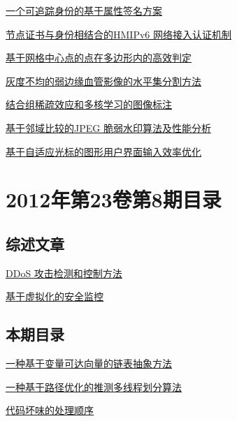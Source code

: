 \documentclass[a4paper]{article}
\begin{document}
\href{http://www.jos.org.cn/ch/reader/download_pdf.aspx?file_no=4172&year_id=2012&quarter_id=9&falg=1}{一个可追踪身份的基于属性签名方案}

\href{http://www.jos.org.cn/ch/reader/download_pdf.aspx?file_no=4188&year_id=2012&quarter_id=9&falg=1}{节点证书与身份相结合的HMIPv6 网络接入认证机制}

\href{http://www.jos.org.cn/ch/reader/download_pdf.aspx?file_no=4087&year_id=2012&quarter_id=9&falg=1}{基于网格中心点的点在多边形内的高效判定}

\href{http://www.jos.org.cn/ch/reader/download_pdf.aspx?file_no=4095&year_id=2012&quarter_id=9&falg=1}{灰度不均的弱边缘血管影像的水平集分割方法}

\href{http://www.jos.org.cn/ch/reader/download_pdf.aspx?file_no=4154&year_id=2012&quarter_id=9&falg=1}{结合组稀疏效应和多核学习的图像标注}

\href{http://www.jos.org.cn/ch/reader/download_pdf.aspx?file_no=4169&year_id=2012&quarter_id=9&falg=1}{基于邻域比较的JPEG 脆弱水印算法及性能分析}

\href{http://www.jos.org.cn/ch/reader/download_pdf.aspx?file_no=4239&year_id=2012&quarter_id=9&falg=1}{基于自适应光标的图形用户界面输入效率优化}


\section{\textbf{2012年第23卷第8期目录}}
\subsection{综述文章}
\href{http://www.jos.org.cn/ch/reader/download_pdf.aspx?file_no=4237&year_id=2012&quarter_id=8&falg=1}{DDoS 攻击检测和控制方法}

\href{http://www.jos.org.cn/ch/reader/download_pdf.aspx?file_no=4219&year_id=2012&quarter_id=8&falg=1}{基于虚拟化的安全监控}

\subsection{本期目录}
\href{http://www.jos.org.cn/ch/reader/download_pdf.aspx?file_no=4132&year_id=2012&quarter_id=8&falg=1}{一种基于变量可达向量的链表抽象方法}

\href{http://www.jos.org.cn/ch/reader/download_pdf.aspx?file_no=4148&year_id=2012&quarter_id=8&falg=1}{一种基于路径优化的推测多线程划分算法}

\href{http://www.jos.org.cn/ch/reader/download_pdf.aspx?file_no=4152&year_id=2012&quarter_id=8&falg=1}{代码坏味的处理顺序}
\end{document}
